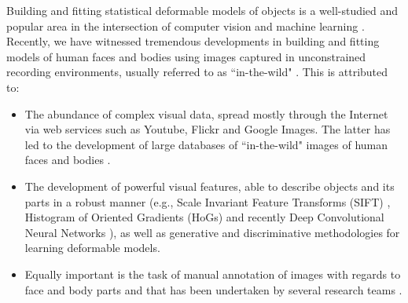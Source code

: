 Building and fitting statistical deformable models of objects is a well-studied and popular area in the intersection of computer vision and machine learning \cite{Cootes1995, Cootes2001, Matthews2004, Saragih2011, Belhumeur2011, Zhu2012, Xiong2013}. Recently, we have witnessed tremendous developments in building and fitting models of human faces and bodies using images captured in unconstrained recording environments, usually referred to as ``in-the-wild" \cite{Belhumeur2011, Cao2012, Zhu2012, Xiong2013, Asthana2013, Tzimiropoulos2014, Asthana2014}. This is attributed to:
\begin{itemize}


\item The abundance of complex visual data, spread mostly through the Internet via web services such as Youtube, Flickr and Google Images. The latter has led to the development of large databases of ``in-the-wild" images of human faces and bodies \cite{Belhumeur2011, Le2012, Zhu2012, Burgos2013}.

\item The development of powerful visual features, able to describe objects and its parts in a robust manner (e.g., Scale Invariant Feature Transforms (SIFT) \cite{lowe1999object}, Histogram of Oriented Gradients (HoGs) \cite{Dalal2005} and recently Deep Convolutional Neural Networks \cite{sermanet2013overfeat}), as well as generative and discriminative methodologies for learning deformable models.

\item Equally important is the task of manual annotation of images with regards to face and body parts and that has been undertaken by several research teams \cite{sagonas_iccv_300w_2013,charles2013domain,dantone2014body,andriluka14cvpr}.

\end{itemize}

